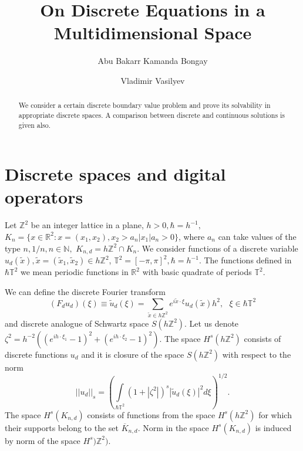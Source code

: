 \documentclass[12pt]{llncs}
\begin{document}
\fi

%
\title{On Discrete Equations in a Multidimensional Space}%
\author{Abu Bakarr Kamanda Bongay   \and  Vladimir Vasilyev
}

\maketitle

\begin{abstract}
We consider a certain discrete boundary value problem and prove its solvability in appropriate discrete spaces. A comparison between discrete and continuous solutions is given also.

\end{abstract}

\section{Discrete spaces and digital operators}



Let $\mathbb Z^2$ be an integer lattice in a plane, $h>0, \hbar=h^{-1},$ $K_n=\{x\in\mathbb R^2: x=(x_1,x_2), x_2>a_n|x_1|a_n>0\}$, where $a_n$ can take values of the type $n, 1/n, n\in\mathbb N,$ $K_{n,d}=h\mathbb Z^2\cap K_n$. We consider functions of a discrete variable $u_d(\tilde x), \tilde x=(\tilde x_1,\tilde x_2)\in h\mathbb Z^2$, $\mathbb T^2=[-\pi,\pi]^2, \hbar=h^{-1}$. The functions defined in $\hbar\mathbb T^2$ we mean periodic functions in $\mathbb R^2$ with basic quadrate of periods $\mathbb T^2$.

We can define the discrete Fourier transform
\[
(F_du_d)(\xi)\equiv\tilde u_d(\xi)=\sum\limits_{\tilde x\in h\mathbb Z^2}e^{i\tilde x\cdot\xi}u_d(\tilde x)h^2,~~~\xi\in\hbar\mathbb T^2
\]
and discrete analogue of Schwartz space  $S(h\mathbb Z^2)$.
Let us denote $\zeta^2=h^{-2}((e^{ih\cdot\xi_1}-1)^2+(e^{ih\cdot\xi_2}-1)^2)$.
The space  $H^s(h\mathbb Z^2)$ consists of discrete functions $u_d$ and it is closure of the space  $S(h\mathbb Z^2)$ with respect to the norm
	\[
	||u_d||_s=\left(\int\limits_{\hbar\mathbb T^2}(1+|\zeta^2|)^s|\tilde u_d(\xi)|^2d\xi\right)^{1/2}.
	\]
The space $H^s(K_{n,d})$ consists of functions \cite{VV} from the space  $H^s(h\mathbb Z^2)$ for which their supports belong to the set  $\overline{K}_{n,d}$. Norm in the space  $H^s(K_{n,d})$ is induced by norm of the space $H^s)\mathbb Z^2)$.
\end{document}
